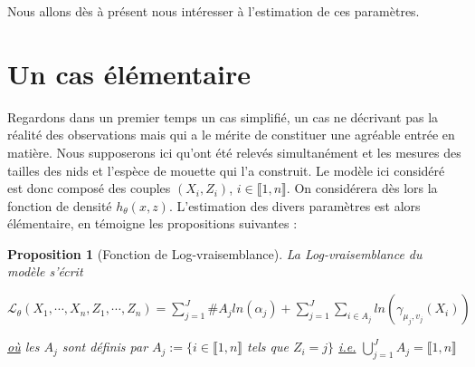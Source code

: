 \documentclass[frenchb]{report}
\newcommand{\1}{\mathbbm{1}}
\newtheorem{prop}{Proposition}
\theoremstyle{definition}\newtheorem{defn}{Définition}
\theoremstyle{definition}\newtheorem{exm}{Exemple}
\theoremstyle{definition}\newtheorem{nota}{Notation}
\theoremstyle{definition}\newtheorem{rem}{Remarque}
\begin{document}
Nous allons dès à présent nous intéresser à l'estimation de ces paramètres.

\section{Un cas élémentaire}

Regardons dans un premier temps un cas simplifié, un cas ne décrivant pas la réalité des observations mais qui a le mérite de constituer une agréable entrée en matière. \newline
Nous supposerons ici qu'ont été relevés simultanément et les mesures des tailles des nids et l'espèce de mouette qui l'a construit. Le modèle ici considéré est donc composé des couples $(X_i, Z_i)$, $i \in \llbracket1,n \rrbracket$. On considérera dès lors la fonction de densité $h_\theta(x,z)$.\newline
L'estimation des divers paramètres est alors élémentaire, en témoigne les propositions suivantes :
\begin{prop}[Fonction de Log-vraisemblance]
La Log-vraisemblance du modèle s'écrit
\begin{center} $\mathcal{L}_\theta(X_1, \cdots, X_n, Z_1, \cdots, Z_n) = \displaystyle \sum_{j=1}^J \#A_j ln(\alpha_j) + \sum_{j=1}^J\sum_{i\in A_j}ln(\gamma_{\mu_j, v_j}(X_i))$ \end{center}
\underline{où} les $A_j$ sont définis par $A_j := \{ i\in \llbracket1,n \rrbracket$ tels que $Z_i = j \}$ \underline{i.e.} $\displaystyle\bigcup_{j=1}^J A_j = \llbracket1,n \rrbracket$
\end{prop}
\end{document}
